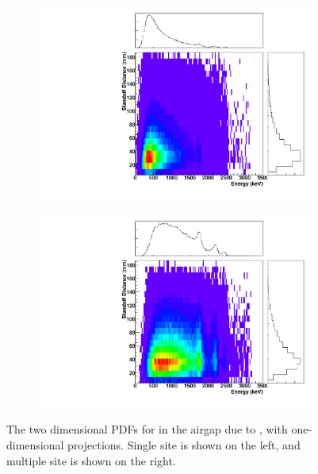 \documentclass[herrin-thesis.tex]{subfiles}
\begin{document}
\begin{figure}[hp]
\centering
	\begin{subfigure}[b]{0.35\textwidth}
	\centering
	\includegraphics[width=\textwidth]{./plots/PDFs/analysis_pdf_AirGap_214_Bi_nochain_ss.pdf}
\end{subfigure}\hspace{0.1\textwidth}%
\begin{subfigure}[b]{0.35\textwidth}
	\centering
	\includegraphics[width=1\textwidth]{./plots/PDFs/analysis_pdf_AirGap_214_Bi_nochain_ms.pdf}
	\end{subfigure}
\caption[PDF for  in the airgap]{The two dimensional PDFs for  in the airgap due to , with one-dimensional projections. Single site is shown on the left, and multiple site is shown on the right.}
\label{fig:analysis_pdf_AirGap_214_Bi_nochain}
\end{figure}
\end{document}
